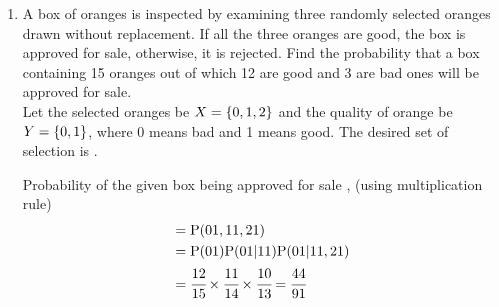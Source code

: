 \begin{enumerate}[label=13.\arabic{enumi}.\arabic{enumii}]

\setcounter{enumi}{1}
\setcounter{enumii}{3}
\item A box of oranges is inspected by examining three randomly selected oranges drawn without replacement. If all the three oranges are good, the box is approved for sale, otherwise, it is rejected. Find the probability that a box containing 15 oranges out of which 12 are good and 3 are bad ones will be approved for sale.\\[1ex]
	\solution
		Let the selected oranges be $X = \left\{0,1,2\right\}$ and the quality of orange be $Y = \left\{0,1\right\}$, where 0 means bad and 1 means good. The desired set of selection is .

	\begin{table}[h!]
	\small
	\centering
	
	\end{table}

		Probability of the given box being approved for sale , (using multiplication rule)	%
	\begin{align}
		=& \; \text{P}(01 , 11 , 21) \\
		=& \; \text{P}(01)\text{P}(01|11)\text{P}(01|11 , 21) \\
		=& \; \cfrac{12}{15}\times \cfrac{11}{14}\times \cfrac{10}{13}= \cfrac{44}{91}
	\end{align}

\end{enumerate}
